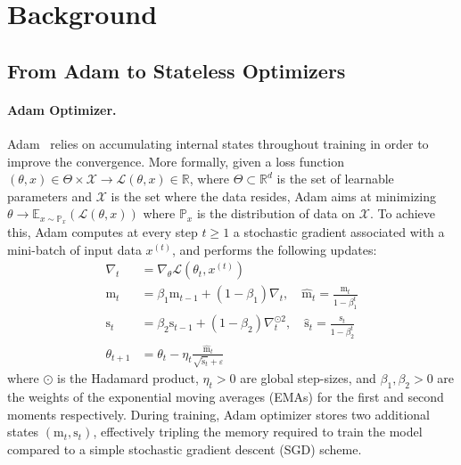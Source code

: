 \section{Background}

\subsection{From Adam to Stateless Optimizers}

\paragraph{Adam Optimizer.} Adam~\citep{adam} relies on accumulating internal states throughout training in order to improve the convergence. More formally, given a loss function $(\theta,x)\in\Theta\times\mathcal{X}\to \mathcal{L}(\theta,x)\in\mathbb{R}$, where $\Theta\subset\mathbb{R}^d$ is the set of learnable parameters and $\mathcal{X}$ is the set where the data resides, Adam aims at minimizing $\theta\to\mathbb{E}_{x\sim \mathbb{P}_x}(\mathcal{L}(\theta,x))$ where $\mathbb{P}_x$ is the distribution of data on $\mathcal{X}$. To achieve this, Adam computes at every step $t\geq 1$ a stochastic gradient associated with a mini-batch of input data $x^{(t)}$, and performs the following updates:
\begin{align*}
    \nabla_t &= \nabla_\theta \mathcal{L}(\theta_t,  x^{(t)})\\
    \text{m}_t & = \beta_1 \text{m}_{t-1} + (1-\beta_1) \nabla_t,\quad \hat{\text{m}}_t=\frac{\text{m}_t}{1-\beta_1^{t}} \\ 
    \text{s}_t & =  \beta_2 \text{s}_{t-1} + (1-\beta_2) \nabla_t^{\odot 2},\quad \hat{\text{s}}_t=\frac{\text{s}_t}{1-\beta_2^{t}}\\ 
    \theta_{t+1} &= \theta_t - \eta_t \frac{\hat{\text{m}}_t}{\sqrt{\hat{\text{s}}_t} +\varepsilon} 
\end{align*}
where $\odot$ is the Hadamard product, $\eta_t>0$ are global step-sizes, and $\beta_1, \beta_2>0$ are the weights of the exponential moving averages (EMAs) for the first and second moments respectively. During training, Adam optimizer stores two additional states $(\text{m}_t,\text{s}_t)$, effectively tripling the memory required to train the model compared to a simple stochastic gradient descent (SGD) scheme.

